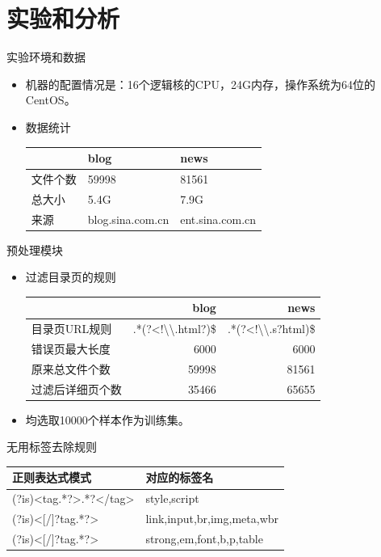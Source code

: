 \section{实验和分析}
\label{sec-3}
\begin{frame}[label=sec-3-1]{实验环境和数据}
\begin{itemize}
\item 机器的配置情况是：16个逻辑核的CPU，24G内存，操作系统为64位的CentOS。
\item 数据统计
\begin{table}[h]
  \centering
\begin{tabular}{lll}
  \toprule
 & blog & news \\
\hline
文件个数 & 59998 & 81561 \\
总大小 & 5.4G & 7.9G \\
来源 & blog.sina.com.cn & ent.sina.com.cn \\
\bottomrule
\end{tabular}
\end{table}
\end{itemize}
\end{frame}

\begin{frame}[label=sec-3-2]{预处理模块}
\begin{itemize}
\item 过滤目录页的规则
\begin{table}[h]
  \centering
\begin{tabular}{lrr}
  \toprule
 & blog & news \\
\hline
目录页URL规则 & .*(?<!\textbackslash\textbackslash.html?)\$ & .*(?<!\textbackslash\textbackslash.s?html)\$ \\
错误页最大长度 & 6000 & 6000 \\
原来总文件个数 & 59998 & 81561 \\
过滤后详细页个数 & 35466 & 65655 \\
\bottomrule
\end{tabular}
\end{table}
\item<2-> 均选取10000个样本作为训练集。
\end{itemize}
\end{frame}

\begin{frame}{无用标签去除规则}
\begin{table}[hb]
  \centering
  \begin{tabular}{ll}
    \toprule
    正则表达式模式 & 对应的标签名 \\
    \hline
    (?is)<tag.*?>.*?</tag> & style,script \\
    (?is)<[/]?tag.*?> & link,input,br,img,meta,wbr \\
    (?is)<[/]?tag.*?> & strong,em,font,b,p,table \\
    \bottomrule
  \end{tabular}
\end{table}
\end{frame}

